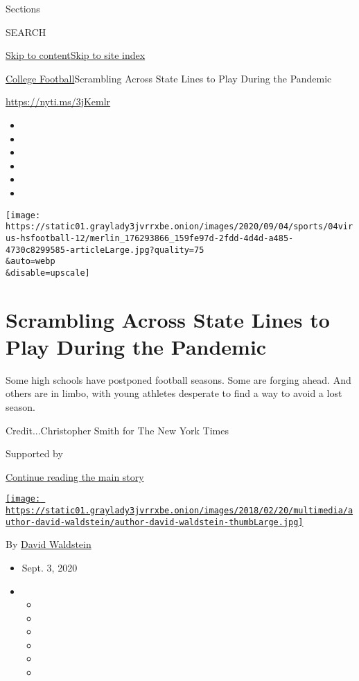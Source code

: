 Sections

SEARCH

\protect\hyperlink{site-content}{Skip to
content}\protect\hyperlink{site-index}{Skip to site index}

\href{/section/sports/ncaafootball}{College
Football}\textbar{}Scrambling Across State Lines to Play During the
Pandemic

\url{https://nyti.ms/3jKemlr}

\begin{itemize}
\item
\item
\item
\item
\item
\item
\end{itemize}

\texttt{[image: https://static01.graylady3jvrrxbe.onion/images/2020/09/04/sports/04virus-hsfootball-12/merlin\_176293866\_159fe97d-2fdd-4d4d-a485-4730c8299585-articleLarge.jpg?quality=75\\\&auto=webp\\\&disable=upscale]}

\hypertarget{scrambling-across-state-lines-to-play-during-the-pandemic}{%
\section{Scrambling Across State Lines to Play During the
Pandemic}\label{scrambling-across-state-lines-to-play-during-the-pandemic}}

Some high schools have postponed football seasons. Some are forging
ahead. And others are in limbo, with young athletes desperate to find a
way to avoid a lost season.

Credit...Christopher Smith for The New York Times

Supported by

\protect\hyperlink{after-sponsor}{Continue reading the main story}

\href{https://www.nytimes3xbfgragh.onion/by/david-waldstein}{\texttt{[image: https://static01.graylady3jvrrxbe.onion/images/2018/02/20/multimedia/author-david-waldstein/author-david-waldstein-thumbLarge.jpg]}}

By \href{https://www.nytimes3xbfgragh.onion/by/david-waldstein}{David
Waldstein}

\begin{itemize}
\item
  Sept. 3, 2020
\item
  \begin{itemize}
  \item
  \item
  \item
  \item
  \item
  \item
  \end{itemize}
\end{itemize}

